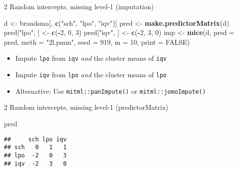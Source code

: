 \documentclass[ignorenonframetext,aspectratio=43]{beamer}
\newenvironment{Shaded}{\begin{snugshade}}{\end{snugshade}}
\newcommand{\KeywordTok}[1]{\textcolor[rgb]{0.13,0.29,0.53}{\textbf{#1}}}
\newcommand{\DataTypeTok}[1]{\textcolor[rgb]{0.13,0.29,0.53}{#1}}
\newcommand{\DecValTok}[1]{\textcolor[rgb]{0.00,0.00,0.81}{#1}}
\newcommand{\StringTok}[1]{\textcolor[rgb]{0.31,0.60,0.02}{#1}}
\newcommand{\OtherTok}[1]{\textcolor[rgb]{0.56,0.35,0.01}{#1}}
\newcommand{\OperatorTok}[1]{\textcolor[rgb]{0.81,0.36,0.00}{\textbf{#1}}}
\newcommand{\NormalTok}[1]{#1}
\providecommand{\tightlist}{%
  \setlength{\itemsep}{0pt}\setlength{\parskip}{0pt}}
\begin{document}
\begin{frame}[fragile]{2 Random intercepts, missing level-1
(imputation)}

\begin{Shaded}
\begin{Highlighting}[]
\NormalTok{d <-}\StringTok{ }\NormalTok{brandsma[, }\KeywordTok{c}\NormalTok{(}\StringTok{"sch"}\NormalTok{, }\StringTok{"lpo"}\NormalTok{, }\StringTok{"iqv"}\NormalTok{)]}
\NormalTok{pred <-}\StringTok{ }\KeywordTok{make.predictorMatrix}\NormalTok{(d)}
\NormalTok{pred[}\StringTok{"lpo"}\NormalTok{, ] <-}\StringTok{ }\KeywordTok{c}\NormalTok{(}\OperatorTok{-}\DecValTok{2}\NormalTok{, }\DecValTok{0}\NormalTok{, }\DecValTok{3}\NormalTok{)}
\NormalTok{pred[}\StringTok{"iqv"}\NormalTok{, ] <-}\StringTok{ }\KeywordTok{c}\NormalTok{(}\OperatorTok{-}\DecValTok{2}\NormalTok{, }\DecValTok{3}\NormalTok{, }\DecValTok{0}\NormalTok{)}
\NormalTok{imp <-}\StringTok{ }\KeywordTok{mice}\NormalTok{(d, }\DataTypeTok{pred =}\NormalTok{ pred, }\DataTypeTok{meth =} \StringTok{"2l.pmm"}\NormalTok{, }\DataTypeTok{seed =} \DecValTok{919}\NormalTok{,}
            \DataTypeTok{m =} \DecValTok{10}\NormalTok{, }\DataTypeTok{print =} \OtherTok{FALSE}\NormalTok{)}
\end{Highlighting}
\end{Shaded}

\begin{itemize}
\tightlist
\item
  Impute \texttt{lpo} from \texttt{iqv} \emph{and} the cluster means of
  \texttt{iqv}
\item
  Impute \texttt{iqv} from \texttt{lpo} \emph{and} the cluster means of
  \texttt{lpo}
\item
  Alternative: Use \texttt{mitml::panImpute()} or
  \texttt{mitml::jomoImpute()}
\end{itemize}

\end{frame}

\begin{frame}[fragile]{2 Random intercepts, missing level-1
(predictorMatrix)}

\begin{Shaded}
\begin{Highlighting}[]
\NormalTok{pred}
\end{Highlighting}
\end{Shaded}

\begin{verbatim}
##     sch lpo iqv
## sch   0   1   1
## lpo  -2   0   3
## iqv  -2   3   0
\end{verbatim}

\end{frame}
\end{document}

